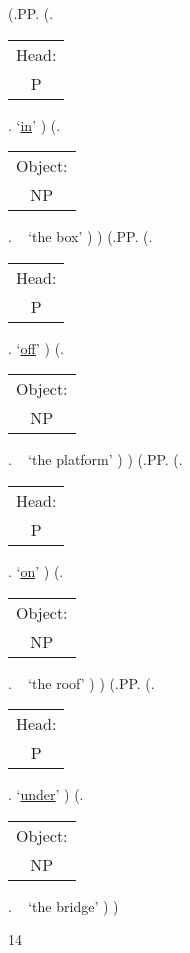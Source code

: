 \documentclass[12pt,letterpaper]{article}
\begin{document}
\begin{figure}
\begin{center}
\begin{parsetree}
			\hfill \break\hfill \break
			(.PP.
			(.\begin{tabular}{c}Head:\\P\end{tabular}. `\underline{in}' )
			(.\begin{tabular}{c}Object:\\NP\end{tabular}. ~ `the box' )
			)
			(.PP.
			(.\begin{tabular}{c}Head:\\P\end{tabular}. `\underline{off}' )
			(.\begin{tabular}{c}Object:\\NP\end{tabular}. ~ `the platform' )
			)
			(.PP.
			(.\begin{tabular}{c}Head:\\P\end{tabular}. `\underline{on}' )
			(.\begin{tabular}{c}Object:\\NP\end{tabular}. ~ `the roof' )
			)
			(.PP.
			(.\begin{tabular}{c}Head:\\P\end{tabular}. `\underline{under}' )
			(.\begin{tabular}{c}Object:\\NP\end{tabular}. ~ `the bridge' )
			)
			
			\hfill \break\hfill \break
		\end{parsetree}
		14
	\end{center}
\end{figure}
\end{document}
